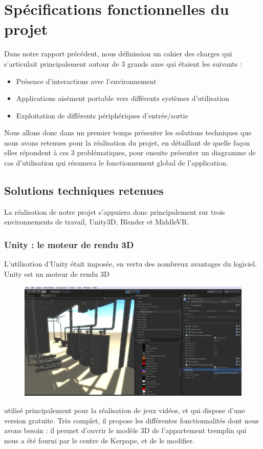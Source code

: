 \section{Spécifications fonctionnelles du projet}

Dans notre rapport précédent, nous définission un cahier des charges qui s'articulait principalement autour de 3 grands axes qui étaient les suivants :
\begin{itemize}\renewcommand{\labelitemi}{$\bullet$}
\item Présence d'interactions avec l'environnement
\item Applications aisément portable vers différents systèmes d'utilisation
\item Exploitation de différents périphériques d'entrée/sortie
\end{itemize}
Nous allons donc dans un premier temps présenter les solutions techniques que nous avons retenues pour la réalisation du projet, en détaillant de quelle façon elles répondent à ces 3 problématiques, pour ensuite présenter un diagramme de cas d'utilisation qui résumera le fonctionnement global de l'application.

\subsection{Solutions techniques retenues}
La réalisation de notre projet s'appuiera donc principalement sur trois environnements de travail, Unity3D, Blender et MiddleVR.

\subsubsection{Unity : le moteur de rendu 3D}
L'utilisation d'Unity était imposée, en vertu des nombreux avantages du logiciel. Unity est un moteur de rendu 3D
\begin{figure}
	\centering
	\includegraphics[scale=0.5]{2-Specifications/img-utilisateur/screen_unity.jpg}
\end{figure}
utilisé principalement pour la réalisation de jeux vidéos, et qui dispose d'une version gratuite. Très complet, il propose les différentes fonctionnalités dont nous avons besoin : il permet d'ouvrir le modèle 3D de l'appartement tremplin qui nous a été fourni par le centre de Kerpape, et de le modifier. \newline

